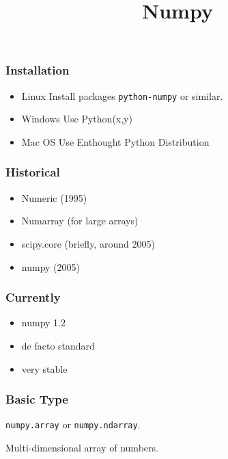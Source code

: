
\title{Numpy}

\frame{\maketitle}

\begin{frame}[fragile]
\frametitle{Installation}

\begin{itemize}
\item \alert{Linux} Install packages \texttt{python-numpy} or similar.
\item \alert{Windows} Use Python(x,y)
\item \alert{Mac OS} Use Enthought Python Distribution
\end{itemize}

\end{frame}

\begin{frame}[fragile]

\frametitle{Historical}

\begin{itemize}
\item Numeric (1995)
\item Numarray (for large arrays)
\item scipy.core (briefly, around 2005)
\item numpy (2005)
\end{itemize}
\end{frame}

\begin{frame}[fragile]
\frametitle{Currently}
\begin{itemize}
\item numpy 1.2
\item \alert{de facto} standard
\item very stable 
\end{itemize}
\end{frame}

\begin{frame}[fragile]
\frametitle{Basic Type}

\lstinline{numpy.array} or \lstinline{numpy.ndarray}.

\bigskip
Multi-dimensional array of numbers.

\end{frame}

